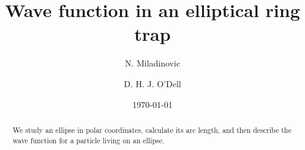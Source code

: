 \documentclass[aps,pra,showpacs,twocolumn]{revtex4}
\begin{document}
\date{\today}
\author{N. Miladinovic}
\author{D. H. J. O'Dell}

\title{Wave function in an elliptical ring trap}

\begin{abstract}
We study an ellipse in polar coordinates, calculate its arc length, and then describe the wave function for a particle living on an ellipse. 
\end{abstract}


\maketitle
\end{document}
